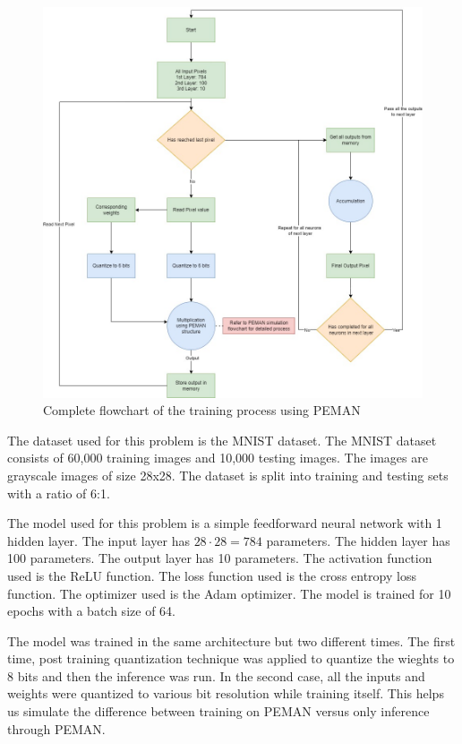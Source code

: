 \begin{figure}
	\centering
	\includegraphics[width=\textwidth]{images/compFLowchart.png}
	\caption{Complete flowchart of the training process using PEMAN}
	\label{compFLowchart}
\end{figure}

The dataset used for this problem is the MNIST dataset. The MNIST dataset consists of 60,000 training images and 10,000 testing images. The images are grayscale images of size 28x28. The dataset is split into training and testing sets with a ratio of 6:1.

The model used for this problem is a simple feedforward neural network with 1 hidden layer. The input layer has $28 \cdot 28 = 784$ parameters. The hidden layer has 100 parameters. The output layer has 10 parameters. The activation function used is the ReLU function. The loss function used is the cross entropy loss function. The optimizer used is the Adam optimizer. The model is trained for 10 epochs with a batch size of 64.

The model was trained in the same architecture but two different times. The first time, post training quantization technique was applied to quantize the wieghts to 8 bits and then the inference was run. In the second case, all the inputs and weights were quantized to various bit resolution while training itself. This helps us simulate the difference between training on PEMAN versus only inference through PEMAN.

